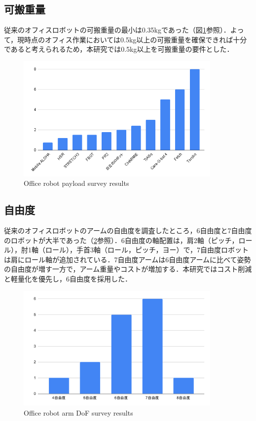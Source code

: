 \subsection{可搬重量}
従来のオフィスロボットの可搬重量の最小は0.35kgであった（図\ref{fig:payload}参照）．よって，現時点のオフィス作業においては0.5kg以上の可搬重量を確保できれば十分であると考えられるため，本研究では0.5kg以上を可搬重量の要件とした．
\begin{figure}
  \centering
  \includegraphics[width=10cm]{images/2syou/payload.png}
  \caption{Office robot payload survey results}
  \label{fig:payload}
\end{figure}
\clearpage

\subsection{自由度}
従来のオフィスロボットのアームの自由度を調査したところ，6自由度と7自由度のロボットが大半であった（\ref{fig:armDof}参照）．6自由度の軸配置は，肩2軸（ピッチ，ロール），肘1軸（ロール），手首3軸（ロール，ピッチ，ヨー）で，7自由度ロボットは肩にロール軸が追加されている．7自由度アームは6自由度アームに比べて姿勢の自由度が増す一方で，アーム重量やコストが増加する．本研究ではコスト削減と軽量化を優先し，6自由度を採用した．
\begin{figure}[h]
  \centering
  \includegraphics[width=10cm]{images/2syou/armDof.pdf}
  \caption{Office robot arm DoF survey results}
  \label{fig:armDof}
\end{figure}
\clearpage

